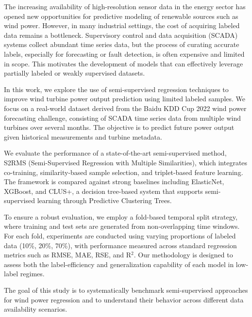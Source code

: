 The increasing availability of high-resolution sensor data in the energy sector has opened new opportunities for predictive modeling of renewable sources such as wind power. However, in many industrial settings, the cost of acquiring labeled data remains a bottleneck. Supervisory control and data acquisition (SCADA) systems collect abundant time series data, but the process of curating accurate labels, especially for forecasting or fault detection, is often expensive and limited in scope. This motivates the development of models that can effectively leverage partially labeled or weakly supervised datasets.

In this work, we explore the use of semi-supervised regression techniques to improve wind turbine power output prediction using limited labeled samples. We focus on a real-world dataset derived from the Baidu KDD Cup 2022 wind power forecasting challenge, consisting of SCADA time series data from multiple wind turbines over several months. The objective is to predict future power output given historical measurements and turbine metadata.

We evaluate the performance of a state-of-the-art semi-supervised method, S2RMS (Semi-Supervised Regression with Multiple Similarities)\cite{liu2024semi}, which integrates co-training, similarity-based sample selection, and triplet-based feature learning. The framework is compared against strong baselines including ElasticNet, XGBoost, and CLUS+\cite{petkovic2023clusplus}, a decision tree-based system that supports semi-supervised learning through Predictive Clustering Trees.

To ensure a robust evaluation, we employ a fold-based temporal split strategy, where training and test sets are generated from non-overlapping time windows. For each fold, experiments are conducted using varying proportions of labeled data (10\%, 20\%, 70\%), with performance measured across standard regression metrics such as RMSE, MAE, RSE, and R$^2$. Our methodology is designed to assess both the label-efficiency and generalization capability of each model in low-label regimes.

The goal of this study is to systematically benchmark semi-supervised approaches for wind power regression and to understand their behavior across different data availability scenarios.

